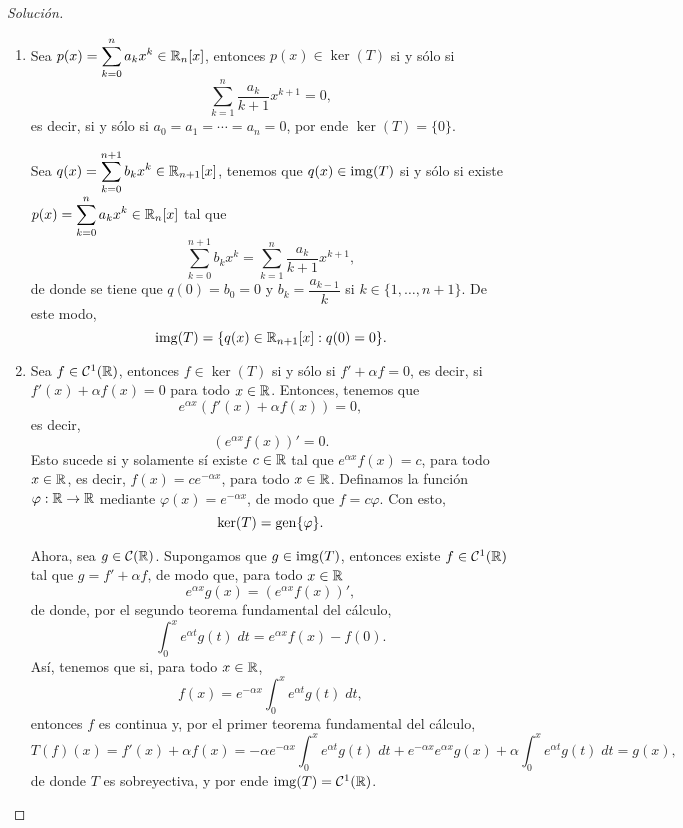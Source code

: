 \documentclass[a4,11pt]{aleph-notas}
\begin{document}
\begin{proof}[Solución]
\begin{enumerate}
    \item Sea $p(x) = \displaystyle\sum_{k=0}^n a_k x^k\in \mathbb{R}_n[x]$, entonces $p(x)\in \ker(T)$ si y sólo si
    \[
        \sum_{k=1}^n \frac{a_k}{k+1}x^{k+1} = 0,
    \]
    es decir, si y sólo si $a_0 = a_1 = \cdots = a_n = 0$, por ende $\ker(T) = \{0\}$. 
    
    Sea $q(x) = \displaystyle\sum_{k=0}^{n+1} b_k x^k\in \mathbb{R}_{n+1}[x]$, tenemos que $q(x)\in\operatorname{img}(T)$ si y sólo si existe $p(x) = \displaystyle\sum_{k=0}^n a_k x^k\in \mathbb{R}_n[x]$ tal que
    \[
        \sum_{k=0}^{n+1} b_k x^k = \sum_{k=1}^n \frac{a_k}{k+1}x^{k+1},
    \]
    de donde se tiene que $q(0) = b_0 = 0$ y $b_k = \dfrac{a_{k-1}}{k}$ si $k\in\{1,\dots,n+1\}$. De este modo,
    \[
        \operatorname{img}(T) = \{q(x)\in \mathbb{R}_{n+1}[x] : q(0) = 0\}.
    \]
    
    \item Sea $f\in\mathcal{C}^1(\mathbb{R})$, entonces $f\in\ker(T)$ si y sólo si $f'+\alpha f = 0$, es decir, si $f'(x) + \alpha f(x) = 0$ para todo $x\in \mathbb{R}$. Entonces, tenemos que
    \[
        e^{\alpha x}(f'(x) + \alpha f(x)) = 0,
    \]
    es decir,
    \[
        (e^{\alpha x}f(x)) ' = 0.
    \]
    Esto sucede si y solamente sí existe $c\in\mathbb{R}$ tal que $e^{\alpha x}f(x) = c$, para todo $x\in\mathbb{R}$, es decir, $f(x) = ce^{-\alpha x}$, para todo $x\in\mathbb{R}$. Definamos la función $\varphi:\mathbb{R}\to\mathbb{R}$ mediante $\varphi(x) = e^{-\alpha x}$, de modo que $f=c\varphi$. Con esto,
    \[
        \ker(T) = \operatorname{gen}\{\varphi\}.
    \]
    
    Ahora, sea $g\in\mathcal{C}(\mathbb{R})$. Supongamos que $g\in\operatorname{img}(T)$, entonces existe $f\in\mathcal{C}^1(\mathbb{R})$ tal que $g = f' + \alpha f$, de modo que, para todo $x\in\mathbb{R}$
    \[
        e^{\alpha x}g(x) = (e^{\alpha x}f(x))',
    \]
    de donde, por el segundo teorema fundamental del cálculo,
    \[
        \int_0^x e^{\alpha t}g(t) \; dt = e^{\alpha x}f(x) - f(0).
    \]
    Así, tenemos que si, para todo $x\in\mathbb{R}$,
    \[
        f(x) = e^{-\alpha x}\int_0^x e^{\alpha t}g(t) \; dt,
    \]
    entonces $f$ es continua y, por el primer teorema fundamental del cálculo,
    \[
        T(f)(x) = f'(x) + \alpha f(x) = -\alpha e^{-\alpha x}\int_0^x e^{\alpha t}g(t) \; dt + e^{-\alpha x} e^{\alpha x}g(x) + \alpha \int_0^x e^{\alpha t}g(t) \; dt = g(x),
    \]
    de donde $T$ es sobreyectiva, y por ende $\operatorname{img}(T)=\mathcal{C}^{1}(\mathbb{R})$.
\end{enumerate}
\end{proof}
\end{document}
